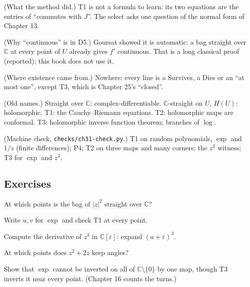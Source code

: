 \begin{lines}
\item[\lab{R1}] (What the method did.) T1 is not a formula to learn: its two equations are the entries of ``commutes with $J$''. The select asks one question of the normal form of Chapter 13.
\item[\lab{R2}] (Why ``continuous'' is in D5.) Goursat showed it is automatic: a bag straight over $\mathbb{C}$ at every point of $U$ already gives $f'$ continuous. That is a long classical proof (reported); this book does not use it.
\item[\lab{R3}] (Where existence came from.) Nowhere: every line is a Survives, a Dies or an ``at most one'', except T3, which is Chapter 25's ``closed''.
\item[\lab{R4}] (Old names.) Straight over $\mathbb{C}$: complex-differentiable. $\mathbb{C}$-straight on $U$, $H(U)$: holomorphic. T1: the Cauchy--Riemann equations. T2: holomorphic maps are conformal. T3: holomorphic inverse function theorem; branches of $\log$.
\item[\lab{R5}] (Machine check, \texttt{checks/ch31-check.py}.) T1 on random polynomials, $\exp$ and $1/z$ (finite differences); P4; T2 on three maps and many corners; the $z^2$ witness; T3 for $\exp$ and $z^3$.
\end{lines}

\subsection*{Exercises}

\begin{lines}
\item[\lab{E1}] At which points is the bag of $|z|^2$ straight over $\mathbb{C}$?
\item[\lab{E2}] Write $u, v$ for $\exp$ and check T1 at every point.
\item[\lab{E3}] Compute the derivative of $z^3$ in $\mathbb{C}[\varepsilon]$: expand $(a + \varepsilon)^3$.
\item[\lab{E4}] At which points does $z^2 + 2z$ keep angles?
\item[\lab{E5}] Show that $\exp$ cannot be inverted on all of $\mathbb{C} \setminus \{0\}$ by one map, though T3 inverts it near every point. (Chapter 16 counts the turns.)
\end{lines}
\newpage

